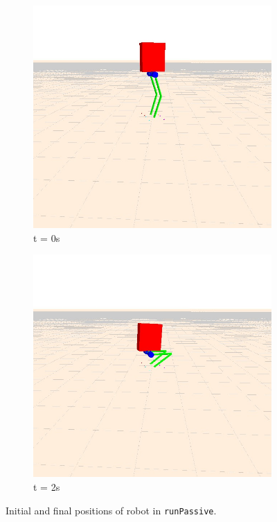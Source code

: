 \documentclass[letterpaper, 10 pt, conference]{ieeeconf}  %
\begin{document}
   \begin{figure}[thpb]
      \begin{subfigure}[b]{\linewidth}
        \includegraphics[width=\linewidth]{figures/runPassiveInitial.jpg}
        \caption{t = 0s}
        \label{runPassiveInit}
      \end{subfigure}
      \begin{subfigure}[b]{\linewidth}
        \includegraphics[width=\linewidth]{figures/runPassiveFinal.jpg}
        \caption{t = 2s}
        \label{runPassiveFinal}
      \end{subfigure}
      \caption{Initial and final positions of robot in {\tt runPassive}.}
      \label{footstep}
   \end{figure}
\end{document}
